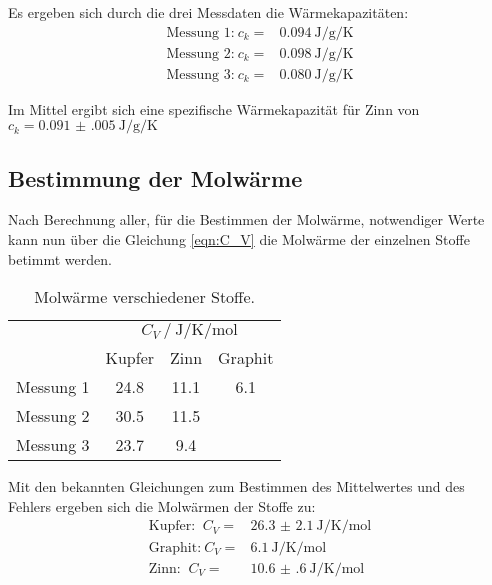 Es ergeben sich durch die drei Messdaten die Wärmekapazitäten:
\begin{align*}
\text{Messung 1:} \: c_k = & \SI{0.094}{\joule\per\g\per\kelvin}   \\ 
\text{Messung 2:} \: c_k = & \SI{0.098}{\joule\per\g\per\kelvin}   \\
\text{Messung 3:} \: c_k = & \SI{0.080}{\joule\per\g\per\kelvin}
\end{align*}

Im Mittel ergibt sich eine spezifische Wärmekapazität für Zinn von $c_k=\SI{0.091(005)}{\joule\per\g\per\kelvin}$

\subsection{Bestimmung der Molwärme}
Nach Berechnung aller, für die Bestimmen der Molwärme, notwendiger Werte kann nun über die Gleichung \eqref{eqn:C_V} die Molwärme der einzelnen Stoffe betimmt werden. 




\begin{table}
    \centering
    \caption{Molwärme verschiedener Stoffe.}
    \label{tab:m}
    \begin{tabular}{c| S S S }
        \toprule
        & \\
        & {Kupfer} & {Zinn} & {Graphit} \\
        \midrule
        Messung 1 & 24.8 & 11.1 & 6.1 \\
        Messung 2 & 30.5 & 11.5  &  \\
        Messung 3 & 23.7 & 9.4 & \\
        \bottomrule 
    \end{tabular}
\end{table}

Mit den bekannten Gleichungen zum Bestimmen des Mittelwertes und des Fehlers ergeben sich die Molwärmen der Stoffe zu:
\begin{align*}
\text{Kupfer: }\: C_V=&\SI{26.3(21)}{\joule\per\kelvin\per\mol}  \\
\text{Graphit:}\: C_V=&\SI{6.1}{\joule\per\kelvin\per\mol}  \\
\text{Zinn: }  \: C_V=&\SI{10.6(6)}{\joule\per\kelvin\per\mol}
\end{align*}


%

